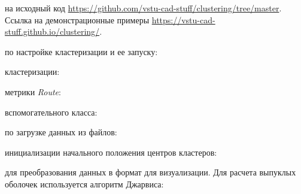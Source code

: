 \addtocounter{page}{10}


 на исходный код \url{https://github.com/vstu-cad-stuff/clustering/tree/master}.\\
Ссылка на демонстрационные примеры \url{https://vstu-cad-stuff.github.io/clustering/}.

 по настройке кластеризации и ее запуску:


 кластеризации:


 метрики \emph{Route}:


 вспомогательного класса:


 по загрузке данных из файлов:


 инициализации начального положения центров кластеров:


\pagebreak
{} для преобразования данных в формат для визуализации. Для расчета выпуклых оболочек используется алгоритм Джарвиса:

